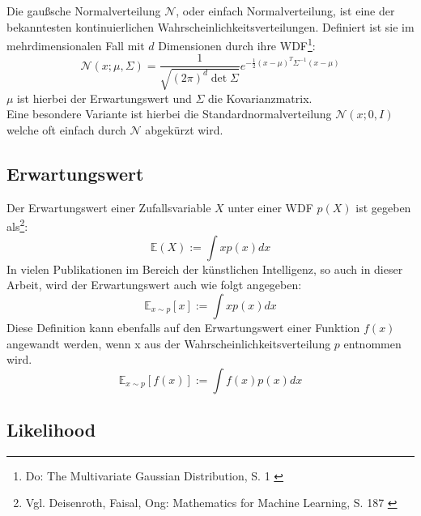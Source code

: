 Die gaußsche Normalverteilung $\mathcal N$, oder einfach Normalverteilung, ist eine der bekanntesten kontinuierlichen Wahrscheinlichkeitsverteilungen. Definiert ist sie im mehrdimensionalen Fall mit $d$ Dimensionen durch ihre \ac{WDF}\footnote{
    Do: The Multivariate Gaussian Distribution, S. 1
    \cite{do2008multivariate}
}:
\begin{equation}
    \mathcal N(x; \mu, \Sigma) = 
    \frac{1}{\sqrt{(2\pi)^d \det{\Sigma}}}
    e^{-\frac{1}{2}(x-\mu)^T \Sigma^{-1} (x-\mu)}
\end{equation}
$\mu$ ist hierbei der Erwartungswert und $\Sigma$ die Kovarianzmatrix. \\
Eine besondere Variante ist hierbei die Standardnormalverteilung $\mathcal N(x; 0, I)$ welche oft einfach durch $\mathcal N$ abgekürzt wird.



\subsection{Erwartungswert}

Der Erwartungswert einer Zufallsvariable $X$ unter einer \ac{WDF} $p(X)$ ist gegeben als\footnote{
    Vgl. Deisenroth, Faisal, Ong: Mathematics for Machine Learning, S. 187
    \cite{Deisenroth2020}
}: 
\begin{equation}
    \mathbb E(X) := \int x p(x) dx
\end{equation}
In vielen Publikationen im Bereich der künstlichen Intelligenz, so auch in dieser Arbeit, wird der Erwartungswert auch wie folgt angegeben:
\begin{equation}
    \mathbb E_{x \sim p}[x] := \int x p(x) dx
\end{equation}
Diese Definition kann ebenfalls auf den Erwartungswert einer Funktion $f(x)$ angewandt werden, wenn x aus der Wahrscheinlichkeitsverteilung $p$ entnommen wird. 
\begin{equation}
    \mathbb E_{x \sim p}[f(x)] := \int f(x) p(x) dx
\end{equation}

\subsection{Likelihood}


